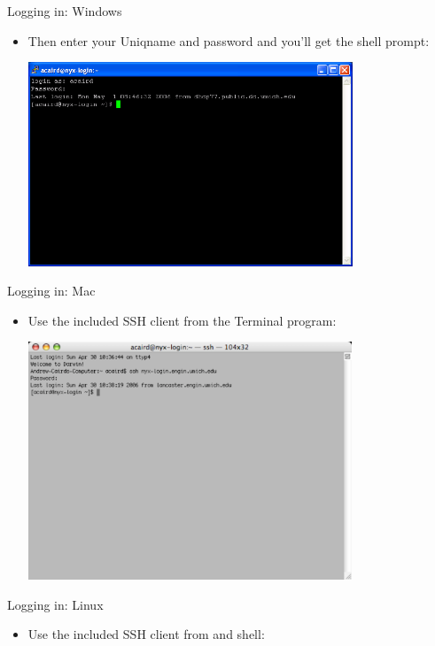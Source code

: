 \documentclass{beamer}
\begin{document}
  \begin{frame}{Logging in: Windows}
    \begin{itemize}
    \item Then enter your Uniqname and password and you'll get the shell prompt:
      \begin{center}\includegraphics[height=2.4in]{ssh-putty-terminal}\end{center}
    \end{itemize}
  \end{frame}
  \begin{frame}{Logging in: Mac}
    \begin{itemize}
    \item Use the included SSH client from the Terminal program: \\
      \begin{center}\includegraphics[height=2.8in]{ssh-terminal}\end{center}
    \end{itemize}
  \end{frame}
  \begin{frame}{Logging in: Linux}
    \begin{itemize}
    \item Use the included SSH client from and shell: \\
    \end{itemize}
  \end{frame}
\end{document}
